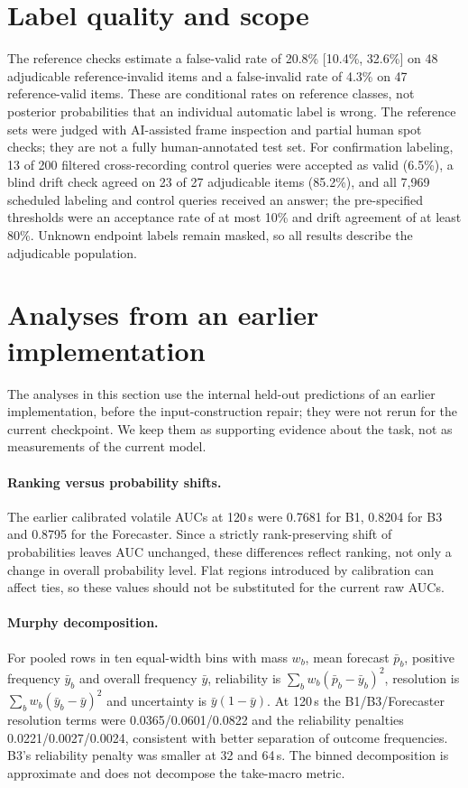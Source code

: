 \documentclass[10pt]{article}
\begin{document}
\section{Label quality and scope}
\label{app:labels}
The reference checks estimate a false-valid rate of 20.8\% [10.4\%, 32.6\%] on 48 adjudicable reference-invalid items and a false-invalid rate of 4.3\% on 47 reference-valid items. These are conditional rates on reference classes, not posterior probabilities that an individual automatic label is wrong. The reference sets were judged with AI-assisted frame inspection and partial human spot checks; they are not a fully human-annotated test set. For confirmation labeling, 13 of 200 filtered cross-recording control queries were accepted as valid (6.5\%), a blind drift check agreed on 23 of 27 adjudicable items (85.2\%), and all 7,969 scheduled labeling and control queries received an answer; the pre-specified thresholds were an acceptance rate of at most 10\% and drift agreement of at least 80\%. Unknown endpoint labels remain masked, so all results describe the adjudicable population.

\section{Analyses from an earlier implementation}
\label{app:earlier}
The analyses in this section use the internal held-out predictions of an earlier implementation, before the input-construction repair; they were not rerun for the current checkpoint. We keep them as supporting evidence about the task, not as measurements of the current model.

\paragraph{Ranking versus probability shifts.} The earlier calibrated volatile AUCs at 120\,s were 0.7681 for B1, 0.8204 for B3 and 0.8795 for the Forecaster. Since a strictly rank-preserving shift of probabilities leaves AUC unchanged, these differences reflect ranking, not only a change in overall probability level. Flat regions introduced by calibration can affect ties, so these values should not be substituted for the current raw AUCs.

\paragraph{Murphy decomposition.} For pooled rows in ten equal-width bins with mass $w_b$, mean forecast $\bar p_b$, positive frequency $\bar y_b$ and overall frequency $\bar y$, reliability is $\sum_b w_b(\bar p_b-\bar y_b)^2$, resolution is $\sum_b w_b(\bar y_b-\bar y)^2$ and uncertainty is $\bar y(1-\bar y)$. At 120\,s the B1/B3/Forecaster resolution terms were 0.0365/0.0601/0.0822 and the reliability penalties 0.0221/0.0027/0.0024, consistent with better separation of outcome frequencies. B3's reliability penalty was smaller at 32 and 64\,s. The binned decomposition is approximate and does not decompose the take-macro metric.
\end{document}
